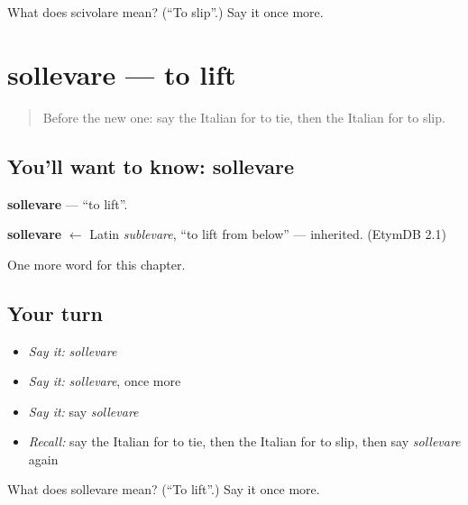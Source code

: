 \begin{tcolorbox}[breakable,colback=teal!4,colframe=teal!35!black,title={Before you move on}]
What does scivolare mean? (\textquotedblleft{}To slip\textquotedblright{}.) Say it once more.
\end{tcolorbox}
\section[sollevare]{sollevare — to lift}

\label{lesson:IT-C184-sollevare}



\begin{quote}
Before the new one: say the Italian for to tie, then the Italian for to slip.
\end{quote}

\subsection*{You'll want to know: sollevare}
\textbf{sollevare} — \textquotedblleft{}to lift\textquotedblright{}.

\begin{cousinweb}
\textbf{sollevare} $\leftarrow$ Latin \emph{sublevare}, \textquotedblleft{}to lift from below\textquotedblright{} — inherited. (EtymDB 2.1)
\end{cousinweb}

\begin{grammarlens}[title={What you've built}]
One more word for this chapter.
\end{grammarlens}

\subsection*{Your turn}
\begin{itemize}
\raggedright
  \item \emph{Say it:} \emph{sollevare}
  \item \emph{Say it:} \emph{sollevare}, once more
  \item \emph{Say it:} say \emph{sollevare}
  \item \emph{Recall:} say the Italian for to tie, then the Italian for to slip, then say \emph{sollevare} again
\end{itemize}

\begin{tcolorbox}[breakable,colback=teal!4,colframe=teal!35!black,title={Before you move on}]
What does sollevare mean? (\textquotedblleft{}To lift\textquotedblright{}.) Say it once more.
\end{tcolorbox}
